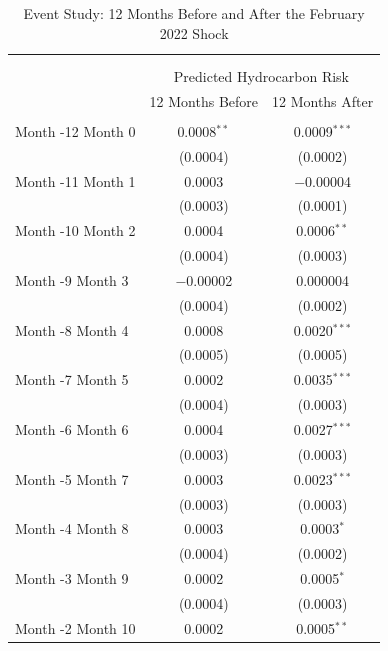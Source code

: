 
\begin{table}[!htbp] \centering 
  \caption{Event Study: 12 Months Before and After the February 2022 Shock} 
  \label{tab:eventstudy_12m_pre_post} 
\scriptsize 
\begin{tabular}{@{\extracolsep{5pt}}lcc} 
\\[-1.8ex]\hline 
\hline \\[-1.8ex] 
\\[-1.8ex] & \multicolumn{2}{c}{Predicted Hydrocarbon Risk} \\ 
 & 12 Months Before & 12 Months After \\ 
\hline \\[-1.8ex] 
 Month -12  \hfill  Month 0 & 0.0008$^{**}$ & 0.0009$^{***}$ \\ 
  & (0.0004) & (0.0002) \\ 
  Month -11  \hfill  Month 1 & 0.0003 & $-$0.00004 \\ 
  & (0.0003) & (0.0001) \\ 
  Month -10  \hfill  Month 2 & 0.0004 & 0.0006$^{**}$ \\ 
  & (0.0004) & (0.0003) \\ 
  Month -9  \hfill  Month 3 & $-$0.00002 & 0.000004 \\ 
  & (0.0004) & (0.0002) \\ 
  Month -8  \hfill  Month 4 & 0.0008 & 0.0020$^{***}$ \\ 
  & (0.0005) & (0.0005) \\ 
  Month -7  \hfill  Month 5 & 0.0002 & 0.0035$^{***}$ \\ 
  & (0.0004) & (0.0003) \\ 
  Month -6  \hfill  Month 6 & 0.0004 & 0.0027$^{***}$ \\ 
  & (0.0003) & (0.0003) \\ 
  Month -5  \hfill  Month 7 & 0.0003 & 0.0023$^{***}$ \\ 
  & (0.0003) & (0.0003) \\ 
  Month -4  \hfill  Month 8 & 0.0003 & 0.0003$^{*}$ \\ 
  & (0.0004) & (0.0002) \\ 
  Month -3  \hfill  Month 9 & 0.0002 & 0.0005$^{*}$ \\ 
  & (0.0004) & (0.0003) \\ 
  Month -2  \hfill  Month 10 & 0.0002 & 0.0005$^{**}$ \\ 

\end{tabular}
\end{table}

